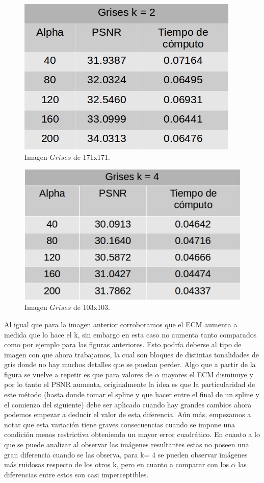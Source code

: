 \documentclass[a4paper]{article}
\begin{document}
     \begin{figure}[H]
    \centering
    \includegraphics[scale=0.4]{imagenes/grises2.jpg}
    \caption{Imagen $Grises$ de 171x171.}
	\label{grisese}
    \end{figure}
    
     \begin{figure}[H]
    \centering
    \includegraphics[scale=0.4]{imagenes/grises4.jpg}
    \caption{Imagen $Grises$ de 103x103.}
	\label{grisese}
    \end{figure}
    
    
Al igual que para la imagen anterior corroboramos que el ECM aumenta a medida que lo hace el k, sin embargo en esta caso no aumenta tanto comparados como por ejemplo para las figuras anteriores. Esto podría deberse al tipo de imagen con que ahora trabajamos, la cual son bloques de distintas tonalidades de gris donde no hay muchos detalles que se puedan perder. Algo que a partir de la figura se vuelve a repetir es que para valores de $\alpha$ mayores el ECM disminuye y por lo tanto el PSNR aumenta, originalmente la idea es que la particularidad de este método (hasta donde tomar el spline y que hacer entre el final de un spline y el comienzo del siguiente) debe ser aplicado cuando hay grandes cambios ahora podemos empezar a deducir el valor de esta diferencia. Aún más, empezamos a notar que esta variación tiene graves consecuencias cuando se impone una condición menos restrictiva  obteniendo un mayor error cuadrático. En cuanto a lo que se puede analizar al observar las imágenes resultantes estas no poseen una gran diferencia cuando se las observa, para k= 4 se pueden observar imágenes más ruidosas respecto de los otros k, pero en cuanto a comparar con los $\alpha$ las diferencias entre estos son casi imperceptibles.              
    
\end{document}
